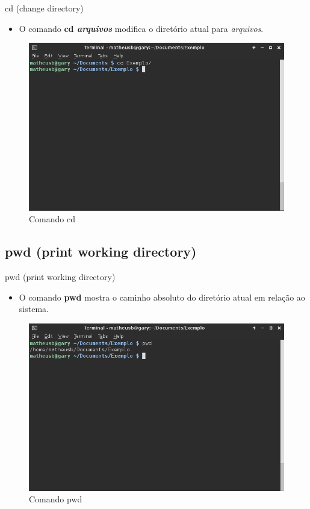 \documentclass{beamer}
\begin{document}
\begin{frame}{cd (change directory)}
  \begin{itemize}
  \item {
   O comando \textbf{cd \textit{arquivos}} modifica o diretório atual para \textit{arquivos}.
  }
 \end{itemize}
   \begin{figure}[h!]
        \centering
        \includegraphics[scale=0.30]{cd.png}
        \caption{Comando cd}
        \label{fig:Comando cd}
    \end{figure}
\end{frame}

\subsection{pwd (print working directory)}

\begin{frame}{pwd (print working directory)}
  \begin{itemize}
  \item {
   O comando \textbf{pwd} mostra o caminho absoluto do diretório atual em rela\c{c}ão ao sistema.
  }
 \end{itemize}
   \begin{figure}[h!]
        \centering
        \includegraphics[scale=0.30]{pwd.png}
        \caption{Comando pwd}
        \label{fig:Comando pwd}
    \end{figure}
\end{frame}
\end{document}
